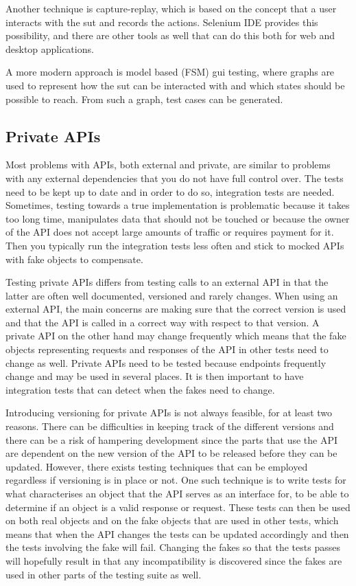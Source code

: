 \documentclass[11pt]{article}
\begin{document}
Another technique is capture-replay, which is based on the concept that a user interacts with the \gls{sut} and records the actions. Selenium IDE provides this possibility, and there are other tools as well that can do this both for web and desktop applications.

A more modern approach is model based (FSM) \gls{gui} testing, where graphs are used to represent how the \gls{sut} can be interacted with and which states should be possible to reach. From such a graph, test cases can be generated.

\subsection{Private APIs}

Most problems with APIs, both external and private, are similar to problems with any external dependencies that you do not have full control over. The tests need to be kept up to date and in order to do so, integration tests are needed. Sometimes, testing towards a true implementation is problematic because it takes too long time, manipulates data that should not be touched or because the owner of the API does not accept large amounts of traffic or requires payment for it. Then you typically run the integration tests less often and stick to mocked APIs with fake objects to compensate. \cite[questions~19-20]{Stenmark}

Testing private APIs differs from testing calls to an external API in that the latter are often well documented, versioned and rarely changes. When using an external API, the main concerns are making sure that the correct version is used and that the API is called in a correct way with respect to that version. A private API on the other hand may change frequently which means that the fake objects representing requests and responses of the API in other tests need to change as well. Private APIs need to be tested because endpoints frequently change and may be used in several places. It is then important to have integration tests that can detect when the fakes need to change. \cite[questions~34,~36]{Edelstam}

Introducing versioning for private APIs is not always feasible, for at least two reasons. There can be difficulties in keeping track of the different versions and there can be a risk of hampering development since the parts that use the API are dependent on the new version of the API to be released before they can be updated. However, there exists testing techniques that can be employed regardless if versioning is in place or not. One such technique is to write tests for what characterises an object that the API serves as an interface for, to be able to determine if an object is a valid response or request. These tests can then be used on both real objects and on the fake objects that are used in other tests, which means that when the API changes the tests can be updated accordingly and then the tests involving the fake will fail. Changing the fakes so that the tests passes will hopefully result in that any incompatibility is discovered since the fakes are used in other parts of the testing suite as well. \cite[question~34]{Edelstam}
\end{document}
